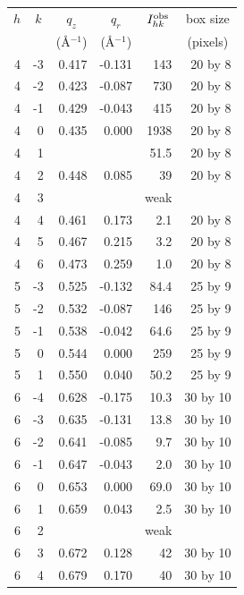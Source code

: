 \begin{table}[htbp]
  \centering
  \begin{tabular}{rrrrrr}
    \hline
    \multicolumn{1}{c}{$h$} & \multicolumn{1}{c}{$k$} & \multicolumn{1}{c}{$q_z$} & \multicolumn{1}{c}{$q_r$} & \multicolumn{1}{c}{$I_{hk}^\textrm{obs}$} & \multicolumn{1}{c}{box size} \\
     & & \multicolumn{1}{c}{(\AA$^{-1}$)} & \multicolumn{1}{c}{(\AA$^{-1}$)} & & \multicolumn{1}{c}{(pixels)} \\ 
    \hline
    4 &	-3 & 0.417 & -0.131 &    143 & 20 by 8 \\
    4 &	-2 & 0.423 & -0.087 &	   730 & 20 by 8 \\
    4	& -1 & 0.429 & -0.043	&    415 & 20 by 8 \\
    4	&  0 & 0.435 &  0.000 &   1938 & 20 by 8 \\
    4	&  1 &       &        &   51.5 & 20 by 8 \\
    4	&  2 & 0.448 &  0.085 &     39 & 20 by 8 \\
    4	&  3 &       &        &   weak & \\
    4	&  4 & 0.461 &  0.173 &    2.1 & 20 by 8 \\
    4	&  5 & 0.467 &  0.215 &    3.2 & 20 by 8 \\
    4 &	 6 & 0.473 &  0.259 &    1.0 & 20 by 8 \\
    5 & -3 & 0.525 & -0.132 &   84.4 & 25 by 9 \\
    5 & -2 & 0.532 & -0.087	&    146 & 25 by 9 \\
    5 & -1 & 0.538 & -0.042	&   64.6 & 25 by 9 \\
    5	&  0 & 0.544 &  0.000	&    259 & 25 by 9 \\
    5	&  1 & 0.550 &  0.040 &   50.2 & 25 by 9 \\
    6 &	-4 & 0.628 & -0.175	& 10.3 & 30 by 10 \\
    6 &	-3 & 0.635 & -0.131	& 13.8 & 30 by 10 \\
    6 & -2 & 0.641 & -0.085	&  9.7 & 30 by 10 \\
    6 & -1 & 0.647 & -0.043 &  2.0 & 30 by 10 \\
    6 &  0 & 0.653 &  0.000	& 69.0 & 30 by 10 \\
    6 &  1 & 0.659 &  0.043 &  2.5 & 30 by 10 \\
    6 &  2 &       &        & weak \\
    6	&  3 & 0.672 &  0.128 &	    42 & 30 by 10 \\
    6	&  4 & 0.679 &  0.170 &     40 & 30 by 10 \\

\end{tabular}
\end{table}

